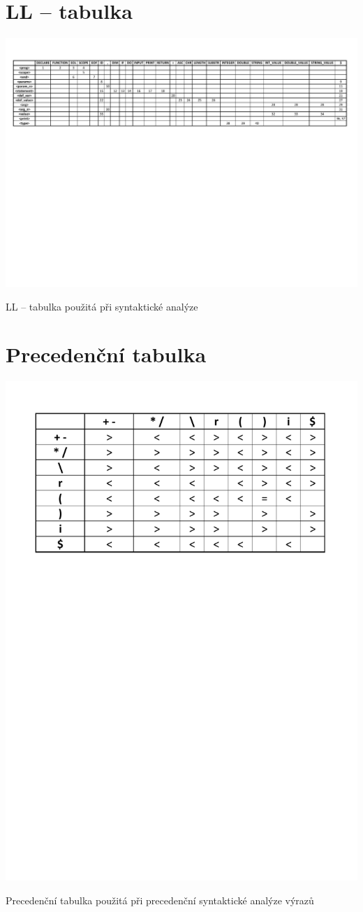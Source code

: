 \documentclass[a4paper, 11pt]{article}
\begin{document}
	\section{LL -- tabulka}
	\begin{table}[!ht]
		\centering
		\includegraphics[width=1\linewidth]{inc/LL_table.pdf}
		\caption{LL -- tabulka použitá při syntaktické analýze}
		\label{table:ll_table}
	\end{table}


	\section{Precedenční tabulka}
	\begin{table}[!ht]
		\centering
		\includegraphics[width=0.7\linewidth]{inc/prec_table.pdf}
		\caption{Precedenční tabulka použitá při precedenční syntaktické analýze výrazů}
		\label{table:prec_table}
	\end{table}
\end{document}
